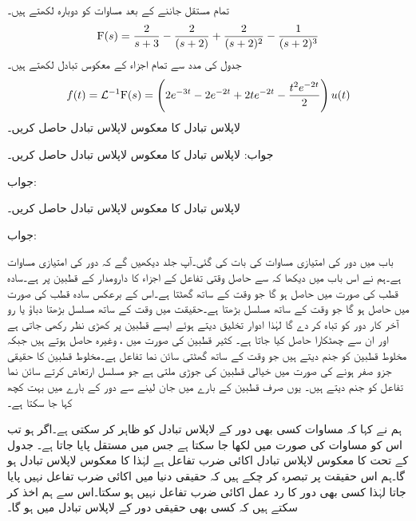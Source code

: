 تمام مستقل جاننے کے بعد مساوات  کو دوبارہ لکھتے ہیں۔
\begin{align*}
{\ensuremath{{\textup{F}}}}(s)=\frac{2}{s+3}-\frac{2}{(s+2)}+\frac{2}{(s+2)^2}-\frac{1}{(s+2)^3}
\end{align*}
جدول  کی مدد سے تمام اجزاء کے معکوس تبادل لکھتے ہیں۔
\begin{align*}
f(t)=\mathcal{L}^{-1}{{\textup{F}}}(s)=\left(2e^{-3t}-2e^{-2t}+2te^{-2t}-\frac{t^2 e^{-2t}}{2}\right)u(t)
\end{align*}
لاپلاس تبادل  کا معکوس لاپلاس تبادل حاصل کریں۔

جواب:
لاپلاس تبادل  کا معکوس لاپلاس تبادل حاصل کریں۔

جواب:

لاپلاس تبادل  کا معکوس لاپلاس تبادل حاصل کریں۔

جواب:

باب  میں دور کی امتیازی مساوات کی بات کی گئی۔آپ جلد دیکھیں گے کہ  دور کی امتیازی مساوات ہے۔ہم نے اس باب میں دیکھا کہ  سے حاصل وقتی تفاعل کے اجزاء کا دارومدار  کے قطبین پر ہے۔سادہ قطب  کی صورت میں   حاصل ہو گا جو وقت کے ساتھ گھٹتا ہے۔اس کے برعکس سادہ قطب  کی صورت میں  حاصل ہو گا جو وقت کے ساتھ مسلسل بڑھتا ہے۔حقیقت میں وقت کے ساتھ مسلسل بڑھتا دباؤ یا رو آخر کار دور کو تباہ کر دے گا لہٰذا ادوار تخلیق دیتے ہوئے ایسے قطبین پر کھڑی نظر رکھی جاتی ہے اور ان سے چھٹکارا حاصل کیا جاتا ہے۔ کثیر قطبین کی صورت میں ،  وغیرہ حاصل ہوتے ہیں جبکہ مخلوط قطبین   کو جنم دیتے ہیں جو وقت کے ساتھ گھٹتی سائن نما تفاعل ہے۔مخلوط قطبین کا حقیقی جزو صفر ہونے کی صورت میں خیالی قطبین کی جوڑی ملتی ہے جو مسلسل ارتعاش کرتے سائن نما تفاعل  کو جنم دیتے ہیں۔ یوں صرف قطبین کے بارے میں جان لینے سے دور کے بارے میں بہت کچھ کہا جا سکتا ہے۔

ہم نے  کہا کہ مساوات  کسی بھی دور کے لاپلاس تبادل کو ظاہر کر سکتی ہے۔اگر  ہو تب اس  کو مساوات  کی صورت میں لکھا جا سکتا ہے جس میں مستقل  پایا جاتا ہے۔ جدول  کے تحت  کا معکوس لاپلاس تبادل  اکائی ضرب تفاعل  ہے لہٰذا  کا معکوس لاپلاس تبادل  ہو گا۔ہم اس حقیقت پر تبصرہ کر چکے ہیں کہ حقیقی دنیا میں اکائی ضرب تفاعل نہیں پایا جاتا لہٰذا کسی بھی دور کا رد عمل اکائی ضرب تفاعل نہیں ہو سکتا۔اس سے ہم اخذ کر سکتے ہیں کہ کسی بھی حقیقی دور کے لاپلاس تبادل میں  ہو گا۔

